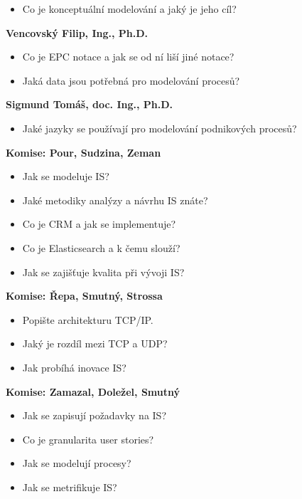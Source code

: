 \begin{profesorbox}
\begin{itemize}
  \item Co je konceptuální modelování a jaký je jeho cíl?
\end{itemize}
\textbf{Vencovský Filip, Ing., Ph.D.}
\begin{itemize}
  \item Co je EPC notace a jak se od ní liší jiné notace?
  \item Jaká data jsou potřebná pro modelování procesů?
\end{itemize}
\textbf{Sigmund Tomáš, doc. Ing., Ph.D.}
\begin{itemize}
  \item Jaké jazyky se používají pro modelování podnikových procesů?
\end{itemize}
\textbf{Komise: Pour, Sudzina, Zeman}
\begin{itemize}
  \item Jak se modeluje IS?
  \item Jaké metodiky analýzy a návrhu IS znáte?
  \item Co je CRM a jak se implementuje?
  \item Co je Elasticsearch a k čemu slouží?
  \item Jak se zajišťuje kvalita při vývoji IS?
\end{itemize}
\textbf{Komise: Řepa, Smutný, Strossa}
\begin{itemize}
  \item Popište architekturu TCP/IP.
  \item Jaký je rozdíl mezi TCP a UDP?
  \item Jak probíhá inovace IS?
\end{itemize}
\textbf{Komise: Zamazal, Doležel, Smutný}
\begin{itemize}
  \item Jak se zapisují požadavky na IS?
  \item Co je granularita user stories?
  \item Jak se modelují procesy?
  \item Jak se metrifikuje IS?
\end{itemize}
\end{profesorbox}
